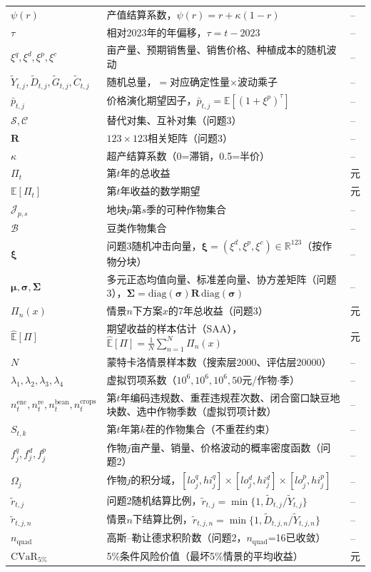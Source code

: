 \documentclass[12pt,a4paper]{article}
\begin{document}
\begin{longtable}{p{3cm}p{8cm}p{2cm}}
$\psi(r)$ & 产值结算系数，$\psi(r)=r+\kappa(1-r)$ & --\\
$\tau$ & 相对2023年的年偏移，$\tau=t-2023$ & --\\
$\xi^q,\xi^d,\xi^p,\xi^c$ & 亩产量、预期销售量、销售价格、种植成本的随机波动 & --\\
$\tilde Y_{t,j},\tilde D_{t,j},\tilde G_{t,j},\tilde C_{t,j}$ & 随机总量，$=$对应确定性量$\times$波动乘子 & --\\
$\bar p_{t,j}$ & 价格演化期望因子，$\bar p_{t,j}=\mathbb{E}[(1+\xi^p)^{\tau}]$ & --\\
$\mathcal{S},\mathcal{C}$ & 替代对集、互补对集（问题3） & --\\
$\mathbf{R}$ & $123\times123$相关矩阵（问题3） & --\\
$\kappa$ & 超产结算系数（0=滞销，0.5=半价） & --\\
$\Pi_t$ & 第$t$年的总收益 & 元\\
$\mathbb{E}[\Pi_t]$ & 第$t$年收益的数学期望 & 元\\
$\mathcal{J}_{p,s}$ & 地块$p$第$s$季的可种作物集合 & --\\
$\mathcal{B}$ & 豆类作物集合 & --\\
$\boldsymbol{\xi}$ & 问题3随机冲击向量，$\boldsymbol{\xi}=(\xi^d,\xi^p,\xi^c)\in\mathbb{R}^{123}$（按作物分块） & --\\
$\boldsymbol{\mu},\boldsymbol{\sigma},\boldsymbol{\Sigma}$ & 多元正态均值向量、标准差向量、协方差矩阵（问题3），$\boldsymbol{\Sigma}=\mathrm{diag}(\boldsymbol{\sigma})\mathbf{R}\,\mathrm{diag}(\boldsymbol{\sigma})$ & --\\
$\Pi_n(x)$ & 情景$n$下方案$x$的7年总收益（问题3） & 元\\
$\hat{\mathbb{E}}[\Pi]$ & 期望收益的样本估计（SAA），$\hat{\mathbb{E}}[\Pi]=\frac1N\sum_{n=1}^{N}\Pi_n(x)$ & 元\\
$N$ & 蒙特卡洛情景样本数（搜索层2000、评估层20000） & --\\
$\lambda_1,\lambda_2,\lambda_3,\lambda_4$ & 虚拟罚项系数（$10^6,10^6,10^6,50$元/作物$\cdot$季） & --\\
$n^{\mathrm{enc}}_t,n^{\mathrm{re}}_t,n^{\mathrm{bean}}_t,n^{\mathrm{crops}}_t$ & 第$t$年编码违规数、重茬违规茬次数、闭合窗口缺豆地块数、选中作物季数（虚拟罚项计数） & --\\
$S_{t,k}$ & 第$t$年第$k$茬的作物集合（不重茬约束） & --\\
$f^q_j,f^d_j,f^p_j$ & 作物$j$亩产量、销量、价格波动的概率密度函数（问题2） & --\\
$\Omega_j$ & 作物$j$的积分域，$[lo^q_j,hi^q_j]\times[lo^d_j,hi^d_j]\times[lo^p_j,hi^p_j]$ & --\\
$\tilde r_{t,j}$ & 问题2随机结算比例，$\tilde r_{t,j}=\min\{1,\tilde D_{t,j}/\tilde Y_{t,j}\}$ & --\\
$\tilde r_{t,j,n}$ & 情景$n$下结算比例，$\tilde r_{t,j,n}=\min\{1,\tilde D_{t,j,n}/\tilde Y_{t,j,n}\}$ & --\\
$n_{\mathrm{quad}}$ & 高斯--勒让德求积阶数（问题2，$n_{\mathrm{quad}}$=16已收敛） & --\\
$\mathrm{CVaR}_{5\%}$ & 5\%条件风险价值（最坏5\%情景的平均收益） & 元\\
\bottomrule
\end{longtable}
\end{document}
